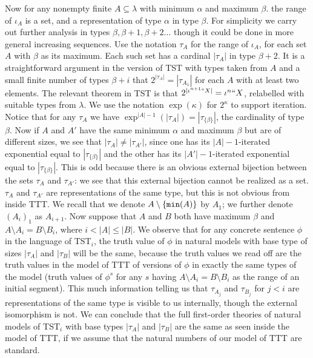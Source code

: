 \documentclass[12pt]{article}
\begin{document}
Now for any nonempty finite $A \subseteq \lambda$ with minimum $\alpha$ and maximum $\beta$. the range of $\iota_A$ is a set, and a representation of type $\alpha$ in
type $\beta$.  For simplicity we carry out further analysis in types $\beta, \beta+1,\beta+2\ldots$ though it could be done in more general increasing sequences.  Use the notation
$\tau_A$ for the range of $\iota_A$, for each set $A$ with $\beta$ as its maximum.  Each such set has a cardinal $|\tau_A|$ in type $\beta+2$.  It is a straightforward
argument in the version of TST with types taken from $A$ and a small finite number of types $\beta+i$ that $2^{|\tau_A|} = |\tau_{A_1}|$ for each $A$ with at least two elements.
The relevant theorem in TST is that $2^{|\iota^{n+1}``X|} = \iota^n``X$, relabelled with suitable types from $\lambda$.   We use the notation $\exp(\kappa)$ for $2^\kappa$ to support iteration.  Notice that for any $\tau_A$ we have $\exp^{|A|-1}(|\tau_A|) = |\tau_{\{\beta\}}|$, the cardinality of type $\beta$.  Now if $A$ and $A'$ have the same minimum $\alpha$ and maximum $\beta$ 
but are of different sizes, we see that $|\tau_A| \neq |\tau_{A'}|$, since one has its $|A|-1$-iterated exponential equal to $|\tau_{\{\beta\}}|$ and the other has its $|A'|-1$-iterated exponential equal to $|\tau_{\{\beta\}}|$.  This is odd because there is an obvious external bijection between the sets $\tau_A$ and $\tau_{A'}$:  we see that this external bijection cannot be realized as a set.  $\tau_A$ and $\tau_{A'}$ are representations of the same type, but this is not obvious from inside TTT.  We recall that we denote $A \setminus \{{\tt min}(A)\}$ by $A_1$;  we further denote $(A_i)_1$ as $A_{i+1}$.  Now suppose that $A$ and $B$ both have maximum $\beta$ and $A \setminus A_i = B \setminus B_i$, where $i<|A| \leq |B|$.
We observe that for any concrete sentence $\phi$  in the language of TST$_i$, the truth value of $\phi$ in natural models with base type of sizes $|\tau_A|$ and $|\tau_B|$ will be the same, because the truth values we read off are the truth values in the model of TTT of versions of $\phi$ in exactly the same types of the model (truth values of $\phi^s$ for
any $s$ having $A \setminus A_i = B\setminus B_i$ as the range of an initial segment).  This much information telling us that $\tau_{A_j}$ and $\tau_{B_j}$ for $j<i$ are representations of the same type  is visible to us internally, though the external isomorphism is not.  We can conclude that the full first-order theories of natural models of TST$_i$ with base types $|\tau_A|$ and $|\tau_B|$ are
the same as seen inside the model of TTT, if we assume that the natural numbers of our model of TTT are standard.
\end{document}
